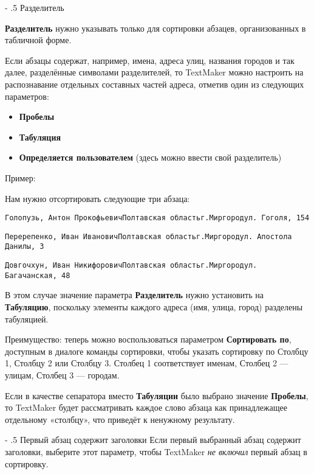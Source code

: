 \documentclass[a4paper,10pt]{article}
\makeatletter
\renewcommand\paragraph{%
   \@startsection{paragraph}{4}{0mm}%
      {-\baselineskip}%
      {.5\baselineskip}%
      {\normalfont\normalsize\bfseries}}
\makeatother
\begin{document}
\paragraph{Разделитель}

\textbf{Разделитель} нужно указывать только для сортировки абзацев, организованных в табличной форме.

Если абзацы содержат, например, имена, адреса улиц, названия городов и так далее, разделённые символами разделителей, то TextMaker можно настроить на распознавание отдельных составных частей адреса, отметив один из следующих параметров:
\begin{itemize}
 \item \textbf{Пробелы}
 \item \textbf{Табуляция}
 \item \textbf{Определяется пользователем} (здесь можно ввести свой разделитель)
\end{itemize}

Пример:

Нам нужно отсортировать следующие три абзаца:

\texttt{Голопузь, Антон ПрокофьевичПолтавская областьг.Миргородул. Гоголя, 154}

\texttt{Перерепенко, Иван ИвановичПолтавская областьг.Миргородул. Апостола Данилы, 3}

\texttt{Довгочхун, Иван НикифоровичПолтавская областьг.Миргородул. Багачанская, 48} 

В этом случае значение параметра \textbf{Разделитель} нужно установить на \textbf{Табуляцию}, поскольку элементы каждого адреса (имя, улица, город) разделены табуляцией.

Преимущество: теперь можно воспользоваться параметром \textbf{Сортировать по}, доступным в диалоге команды сортировки, чтобы указать сортировку по Столбцу 1, Столбцу 2 или Столбцу 3. Столбец 1 соответствует именам, Столбец 2 --- улицам, Столбец 3 --- городам.

Если в качестве сепаратора вместо \textbf{Табуляции} было выбрано значение \textbf{Пробелы}, то TextMaker будет рассматривать каждое слово абзаца как принадлежащее отдельному «столбцу», что приведёт к ненужному результату.

\paragraph{Первый абзац содержит заголовки}
Если первый выбранный абзац содержит заголовки, выберите этот параметр, чтобы TextMaker \textit{не включил} первый абзац в сортировку.
\end{document}
